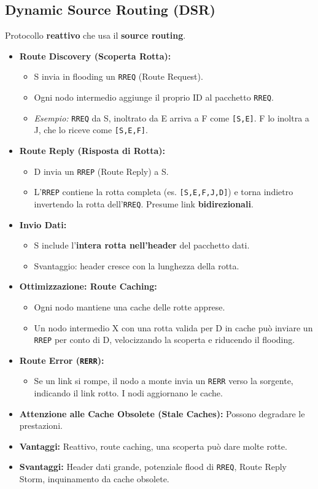 \documentclass{article}
\begin{document}
\subsection{Dynamic Source Routing (DSR)}
Protocollo \textbf{reattivo} che usa il \textbf{source routing}.
\begin{itemize}
    \item \textbf{Route Discovery (Scoperta Rotta):}
    \begin{itemize}
        \item S invia in flooding un \texttt{RREQ} (Route Request).
        \item Ogni nodo intermedio aggiunge il proprio ID al pacchetto \texttt{RREQ}.
        \item \textit{Esempio:} \texttt{RREQ} da S, inoltrato da E arriva a F come \texttt{[S,E]}. F lo inoltra a J, che lo riceve come \texttt{[S,E,F]}.
    \end{itemize}
    \item \textbf{Route Reply (Risposta di Rotta):}
    \begin{itemize}
        \item D invia un \texttt{RREP} (Route Reply) a S.
        \item L'\texttt{RREP} contiene la rotta completa (es. \texttt{[S,E,F,J,D]}) e torna indietro invertendo la rotta dell'\texttt{RREQ}. Presume link \textbf{bidirezionali}.
    \end{itemize}
    \item \textbf{Invio Dati:}
    \begin{itemize}
        \item S include l'\textbf{intera rotta nell'header} del pacchetto dati.
        \item Svantaggio: header cresce con la lunghezza della rotta.
    \end{itemize}
    \item \textbf{Ottimizzazione: Route Caching:}
    \begin{itemize}
        \item Ogni nodo mantiene una cache delle rotte apprese.
        \item Un nodo intermedio X con una rotta valida per D in cache può inviare un \texttt{RREP} per conto di D, velocizzando la scoperta e riducendo il flooding.
    \end{itemize}
    \item \textbf{Route Error (\texttt{RERR}):}
    \begin{itemize}
        \item Se un link si rompe, il nodo a monte invia un \texttt{RERR} verso la sorgente, indicando il link rotto. I nodi aggiornano le cache.
    \end{itemize}
    \item \textbf{Attenzione alle Cache Obsolete (Stale Caches):} Possono degradare le prestazioni.
    \item \textbf{Vantaggi:} Reattivo, route caching, una scoperta può dare molte rotte.
    \item \textbf{Svantaggi:} Header dati grande, potenziale flood di \texttt{RREQ}, Route Reply Storm, inquinamento da cache obsolete.
\end{itemize}
\end{document}
